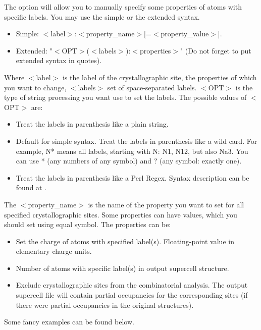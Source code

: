 \documentclass[a4paper,english]{article}
\begin{document}
\begin{Description}
\item[\OptArg{-p }{labels-properties}, \OptArg{\Dd property=}{labels-properties}]
      The option will allow you to manually specify some properties of atoms with specific labels. You may use the simple or the extended syntax.
       \begin{itemize}
         \item Simple: $<$label$>$:$<$property\_name$>$[=$<$property\_value$>$].
         \item Extended: "$<$OPT$>$($<$labels$>$):{$<$properties$>$}" (Do not forget to put extended syntax in quotes).
       \end{itemize}
       Where $<$label$>$ is the label of the crystallographic site, the properties of which you want to change, $<$labels$>$ set of space-separated labels. $<$OPT$>$ is the type of string processing you want use to set the labels. The possible values of $<$OPT$>$ are:
       \begin{itemize}
         \item[p] Treat the labels in parenthesis like a plain string. 
         \item[w, ""] Default for simple syntax. Treat the labels in parenthesis like a wild card. For example, N* means all labels, starting with N: N1, N12, but also Na3. You can use * (any numbers of any symbol) and ? (any symbol: exactly one).
         \item[r] Treat the labels in parenthesis like a Perl Regex. Syntax description can be found at .
       \end{itemize}
       The $<$property\_name$>$ is the name of the property you want to set for all specified crystallographic sites. Some properties can have values, which you should set using equal symbol. The properties can be:
       \begin{itemize}
         \item[c\Lbr harge\Rbr] Set the charge of atoms with specified label(s). Floating-point value in elementary charge units.
         \item[p\Lbr opulation\Rbr] Number of atoms with specific label(s) in output supercell structure.
         \item[\Lbr not\Rbr fixed] Exclude crystallographic sites from the combinatorial analysis. The output supercell file will contain partial occupancies for the corresponding sites (if there were partial occupancies in the original structures).
       \end{itemize}
       Some fancy examples can be found below.      
      

\end{Description}
\end{document}
